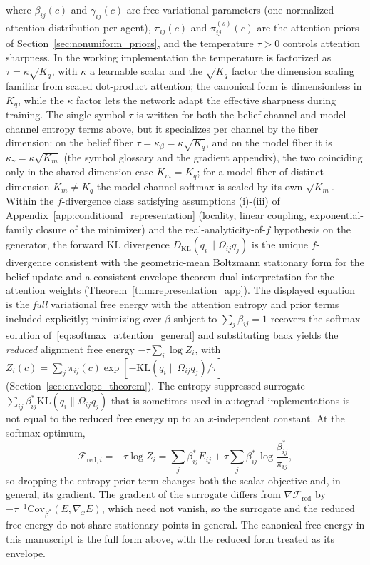 \documentclass[11pt]{article}
\begin{document}
where $\beta_{ij}(c)$ and $\gamma_{ij}(c)$ are free variational parameters (one normalized attention distribution per agent), $\pi_{ij}(c)$ and $\pi^{(s)}_{ij}(c)$ are the attention priors of Section~\ref{sec:nonuniform_priors}, and the temperature $\tau > 0$ controls attention sharpness. In the working implementation the temperature is factorized as $\tau = \kappa\sqrt{K_q}$, with $\kappa$ a learnable scalar and the $\sqrt{K_q}$ factor the dimension scaling familiar from scaled dot-product attention; the canonical form is dimensionless in $K_q$, while the $\kappa$ factor lets the network adapt the effective sharpness during training. The single symbol $\tau$ is written for both the belief-channel and model-channel entropy terms above, but it specializes per channel by the fiber dimension: on the belief fiber $\tau = \kappa_\beta = \kappa\sqrt{K_q}$, and on the model fiber it is $\kappa_\gamma = \kappa\sqrt{K_m}$ (the symbol glossary and the gradient appendix), the two coinciding only in the shared-dimension case $K_m = K_q$; for a model fiber of distinct dimension $K_m \neq K_q$ the model-channel softmax is scaled by its own $\sqrt{K_m}$. Within the $f$-divergence class satisfying assumptions (i)-(iii) of Appendix~\ref{app:conditional_representation} (locality, linear coupling, exponential-family closure of the minimizer) and the real-analyticity-of-$f$ hypothesis on the generator, the forward KL divergence $D_{\mathrm{KL}}(q_i \| \Omega_{ij}q_j)$ is the unique $f$-divergence consistent with the geometric-mean Boltzmann stationary form for the belief update and a consistent envelope-theorem dual interpretation for the attention weights (Theorem~\ref{thm:representation_app}). The displayed equation is the \emph{full} variational free energy with the attention entropy and prior terms included explicitly; minimizing over $\beta$ subject to $\sum_j \beta_{ij} = 1$ recovers the softmax solution of~\eqref{eq:softmax_attention_general} and substituting back yields the \emph{reduced} alignment free energy $-\tau \sum_i \log Z_i$, with $Z_i(c) = \sum_j \pi_{ij}(c)\exp[-\mathrm{KL}(q_i \| \Omega_{ij}q_j)/\tau]$ (Section~\ref{sec:envelope_theorem}). The entropy-suppressed surrogate $\sum_{ij}\beta^*_{ij}\mathrm{KL}(q_i \| \Omega_{ij}q_j)$ that is sometimes used in autograd implementations is not equal to the reduced free energy up to an $x$-independent constant. At the softmax optimum,
\[
\mathcal{F}_{\mathrm{red},i}
= -\tau \log Z_i
= \sum_j \beta^*_{ij}E_{ij}
+ \tau\sum_j \beta^*_{ij}\log\frac{\beta^*_{ij}}{\pi_{ij}},
\]
so dropping the entropy-prior term changes both the scalar objective and, in general, its gradient. The gradient of the surrogate differs from $\nabla \mathcal{F}_{\mathrm{red}}$ by $-\tau^{-1}\mathrm{Cov}_{\beta^*}(E,\nabla_x E)$, which need not vanish, so the surrogate and the reduced free energy do not share stationary points in general. The canonical free energy in this manuscript is the full form above, with the reduced form treated as its envelope.
\end{document}
